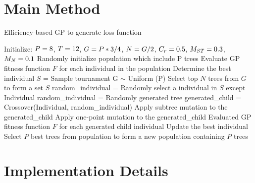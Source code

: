 \begin{ZhChapter}

\section{Main Method}

\begin{algorithm}
    \caption{Efficiency-based GP to generate loss function}\label{alg:cap}
    \begin{algorithmic}
        \State Initialize: \space $P = \space 8$, $T =\space 12$, $G =\space P*3/4$, $N = \space G/2$, $C_r = \space0.5$, $M_{ST} = \space0.3$, $M_N = \space0.1$
        \State Randomly initialize population which include P trees
        \State Evaluate GP fitness function $F$ for each individual in the population
        \State Determine the best individual
        \State $S$ = Sample tournament G $\sim$ Uniform (P)
        \State Select top $N$ trees from $G$ to form a set $S$
        \State random\_individual = Randomly select a individual in $S$ except Individual
        \Else
        \State random\_individual = Randomly generated tree
        \EndIf
        \State generated\_child = Crossover(Individual, random\_individual)
        \State Apply subtree mutation to the generated\_child
        \EndIf
        \State Apply one-point mutation to the generated\_child
        \EndIf
        \EndFor
        \State Evaluated GP fitness function $F$ for each generated child individual
        \State Update the best individual
        \State Select $P$ best trees from population to form a new population containing $P$ trees
        \EndWhile
    \end{algorithmic}
\end{algorithm}

\section{Implementation Details}


\end{ZhChapter}
